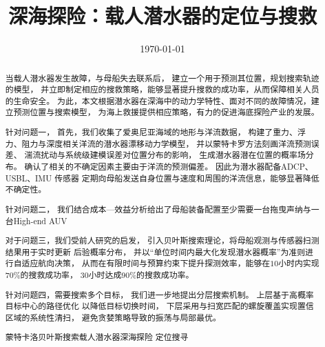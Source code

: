 \documentclass{mcmthesis}
\title{深海探险：载人潜水器的定位与搜救}
\date{\today}
\renewcommand{\contentsname}{\hspace*{\fill}\Large\bfseries Contents \hspace*{\fill}}
\begin{document}
\begin{abstract}
当载人潜水器发生故障，与母船失去联系后，
建立一个用于预测其位置，规划搜索轨迹的模型，
并立即制定相应的搜救策略，能够显著提升搜救的成功率，从而保障相关人员的生命安全。
为此，本文根据潜水器在深海中的动力学特性、面对不同的故障情况，建立预测位置与搜索模型，
为海上救援提供相应策略，有力的促进海底探险产业的发展。

针对问题一，
首先，我们收集了爱奥尼亚海域的地形与洋流数据，
构建了重力、浮力、阻力与深度相关洋流的潜水器漂移动力学模型，
并以蒙特卡罗方法刻画洋流预测误差、
湍流扰动与系统级建模误差对位置分布的影响，
生成潜水器潜在位置的概率场分布。
确认了相关的不确定因素主要由于洋流的预测偏差。
因此为潜水器配备ADCP、USBL、IMU 传感器
定期向母船发送自身位置与速度和周围的洋流信息，能够显著降低不确定性。

针对问题二，
我们结合成本—效益分析给出了母船装备配置至少需要一台拖曳声纳与一台High-end AUV


对于问题三，我们受前人研究的启发，
引入贝叶斯搜索理论，将母船观测与传感器扫测结果用于实时更新 后验概率分布，
并以“单位时间内最大化发现潜水器概率”为准则进行自适应航向决策，
从而在有限时间与预算约束下提升探测效率，能够在$10$小时内实现$70\%$的搜救成功率，
$30$小时达成90\%的搜救成功率。

针对问题四，需要搜索多个目标，
我们进一步地提出分层搜索机制。
上层基于高概率目标中心的路径优化
以降低目标切换时间，
下层采用与扫宽匹配的螺旋覆盖实现置信区域的系统性清扫，
避免贪婪策略导致的振荡与局部最优。













\begin{keywords}
蒙特卡洛\quad 贝叶斯搜索\quad 载人潜水器\quad 深海探险 \quad 定位搜寻
\end{keywords}
\end{abstract}

\maketitle

\tableofcontents        %
\newpage
\thispagestyle{fancy}
\end{document}

